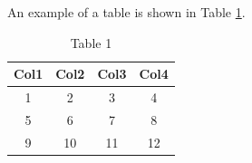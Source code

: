 An example of a table is shown in Table \ref{tab:tab1}.

\begin{table}[H]\centering\caption{
    Table 1
}\label{tab:tab1}
	\begin{tabular}{cccc}\hline
        Col1 & Col2 & Col3 & Col4\\\hline
        1 & 2 & 3 & 4\\
        5 & 6 & 7 & 8\\
        9 & 10 & 11 & 12\\
		\hline
	\end{tabular}
\end{table}